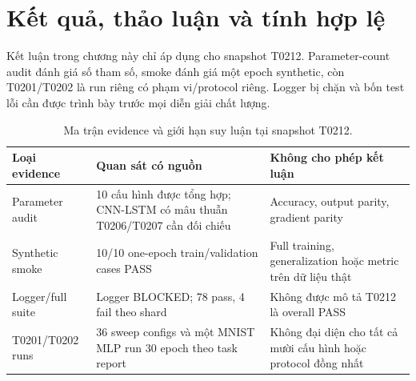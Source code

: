 \section{Kết quả, thảo luận và tính hợp lệ}
Kết luận trong chương này chỉ áp dụng cho snapshot T0212. Parameter-count audit đánh giá số tham số, smoke đánh giá một epoch synthetic, còn T0201/T0202 là run riêng có phạm vi/protocol riêng. Logger bị chặn và bốn test lỗi cần được trình bày trước mọi diễn giải chất lượng.

\begin{table}[htbp]
\centering
\caption{Ma trận evidence và giới hạn suy luận tại snapshot T0212.}
\label{tab:t0212-evidence-matrix}
\begin{tabularx}{\textwidth}{p{}p{}Y}
\toprule
Loại evidence & Quan sát có nguồn & Không cho phép kết luận \\
\midrule
Parameter audit & 10 cấu hình được tổng hợp; CNN-LSTM có mâu thuẫn T0206/T0207 cần đối chiếu & Accuracy, output parity, gradient parity \\
Synthetic smoke & 10/10 one-epoch train/validation cases PASS & Full training, generalization hoặc metric trên dữ liệu thật \\
Logger/full suite & Logger BLOCKED; 78 pass, 4 fail theo shard & Không được mô tả T0212 là overall PASS \\
T0201/T0202 runs & 36 sweep configs và một MNIST MLP run 30 epoch theo task report & Không đại diện cho tất cả mười cấu hình hoặc protocol đồng nhất \\
\bottomrule
\end{tabularx}
\end{table}